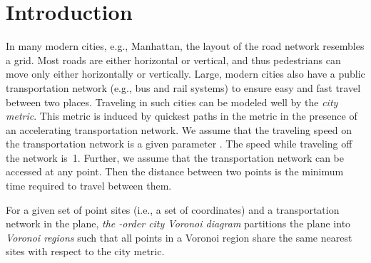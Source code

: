 \documentclass[11pt]{llncs}
\newcommand{\kth}{\ensuremath{k^{\mathrm{th}}}\xspace}
\newcommand{\kthorder}{\kth-order\xspace}
\newcommand{\deleted}[1]{}
\begin{document}
\begin{abstract}
\deleted{
We address  nearest neighbor problems in the presence of transportation networks on the  plane, which is commonly referred to as city metric.
More specifically, we investigate the higher-order city Voronoi diagrams
to derive the complexities and develop algorithms.
For the structural complexity of \kthorder city Voronoi diagrams
we show a lower bound of  and an upper bound of , where  is the complexity of the transportation network.
This is quite different from the bound  in the Euclidean metric \cite{Lee-82}.
In particular, for , the complexity in the Euclidean metric is ,
while that in the city metric is .
Furthermore, we develop an iterative algorithm to compute the -order city Voronoi diagram
in  time
and a divide-and-conquer algorithm to compute the farthest-site city Voronoi diagram in  time.
Our complexity results further indicates that the impact of the transportation network is not a constant
but increases with the value of , and the underlying distance metric will affect the structural complexity of higher-order Voronoi diagram a lot. }

\end{abstract}



\section{Introduction}

In many modern cities, e.g., Manhattan, the layout of the road network resembles a grid.
Most roads are either horizontal or vertical, and thus pedestrians can move only either horizontally or vertically.
Large, modern cities also have a public transportation network (e.g., bus and rail systems)
to ensure easy and fast travel between two places.
Traveling in such cities can be modeled well by the \emph{city metric}.
This metric is induced by quickest paths in the  metric in the presence of an accelerating transportation network.
We assume that the traveling speed on the transportation network is a given parameter .
The speed while traveling off the network is~1.
Further, we assume that the transportation network can be accessed at any point.
Then
the distance between two points is the minimum time required to travel between them.

For a given set  of  point sites (i.e., a set of  coordinates) and a transportation network in the plane,
\emph{the -order city Voronoi diagram} 
partitions the plane into \emph{Voronoi regions}
such that all points in a Voronoi region share the same  nearest sites
with respect to the city metric.
\end{document}

